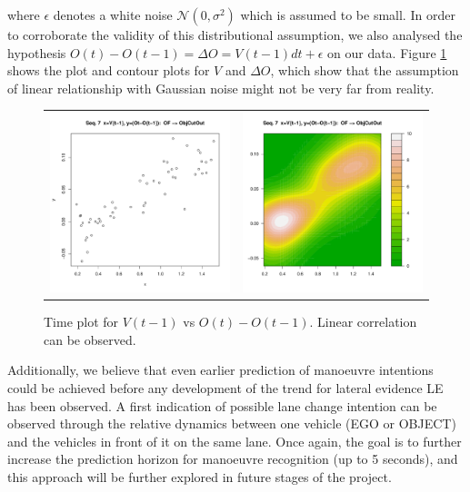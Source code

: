where $\epsilon$ denotes a white noise $\mathcal{N}(0,\sigma^2)$ which is assumed to be small. In order to corroborate the validity of this distributional assumption, we also analysed the hypothesis $O(t) - O(t-1) = \Delta O = V(t-1)dt +\epsilon$ on our data. Figure \ref{Figure:daimlerVvsOffs} shows the plot and contour plots for $V$ and $\Delta O$, which show that the assumption of linear relationship with Gaussian noise might not be very far from reality. 

\begin{figure}
  \centering
  \setlength{\tabcolsep}{0.05pt}
  \renewcommand{\arraystretch}{0.02}
    \begin{tabular}{cc}
    \includegraphics[width=60mm]{figures/DaimlerOBJplotSerie7.pdf}&
    \includegraphics[width=60mm]{figures/DaimlerOBJcontourSerie7.pdf}\\
  \end{tabular}
      \caption{ \label{Figure:daimlerVvsOffs}Time plot for $V(t-1)$ vs $O(t) - O(t-1)$. Linear correlation can be observed.}
\end{figure}

Additionally,  we believe that even earlier prediction of manoeuvre intentions could be achieved before any development of the trend for lateral evidence LE has been observed. A first indication of possible lane change intention can be observed through the relative dynamics between one vehicle (EGO or OBJECT) and the vehicles in front of it on the same lane. Once again, the goal is to further increase the prediction horizon for manoeuvre recognition (up to 5 seconds), and this approach will be further explored in future stages of the project. 

